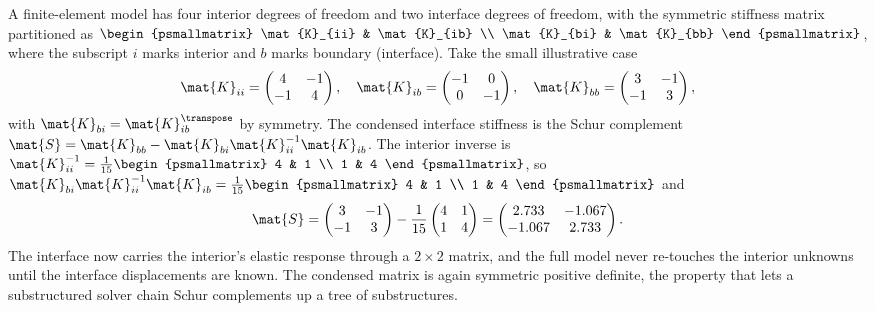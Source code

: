 \begin{example}
A finite-element model has four interior degrees of freedom and two
interface degrees of freedom, with the symmetric stiffness matrix
partitioned as $\begin{psmallmatrix} \mat{K}_{ii} & \mat{K}_{ib} \\
\mat{K}_{bi} & \mat{K}_{bb} \end{psmallmatrix}$, where the subscript
$i$ marks interior and $b$ marks boundary (interface). Take the small
illustrative case
\[
\mat{K}_{ii} = \begin{pmatrix} 4 & -1 \\ -1 & 4 \end{pmatrix}, \quad
\mat{K}_{ib} = \begin{pmatrix} -1 & 0 \\ 0 & -1 \end{pmatrix}, \quad
\mat{K}_{bb} = \begin{pmatrix} 3 & -1 \\ -1 & 3 \end{pmatrix},
\]
with $\mat{K}_{bi} = \mat{K}_{ib}^{\transpose}$ by symmetry. The
condensed interface stiffness is the Schur complement $\mat{S} =
\mat{K}_{bb} - \mat{K}_{bi}\mat{K}_{ii}^{-1}\mat{K}_{ib}$. The
interior inverse is $\mat{K}_{ii}^{-1} = \tfrac{1}{15}
\begin{psmallmatrix} 4 & 1 \\ 1 & 4 \end{psmallmatrix}$, so
$\mat{K}_{bi}\mat{K}_{ii}^{-1}\mat{K}_{ib} = \tfrac{1}{15}
\begin{psmallmatrix} 4 & 1 \\ 1 & 4 \end{psmallmatrix}$ and
\[
\mat{S} = \begin{pmatrix} 3 & -1 \\ -1 & 3 \end{pmatrix}
- \frac{1}{15}\begin{pmatrix} 4 & 1 \\ 1 & 4 \end{pmatrix}
= \begin{pmatrix} 2.733 & -1.067 \\ -1.067 & 2.733 \end{pmatrix}.
\]
The interface now carries the interior's elastic response through a
$2 \times 2$ matrix, and the full model never re-touches the interior
unknowns until the interface displacements are known. The condensed
matrix is again symmetric positive definite, the property that lets a
substructured solver chain Schur complements up a tree of
substructures.
\end{example}

